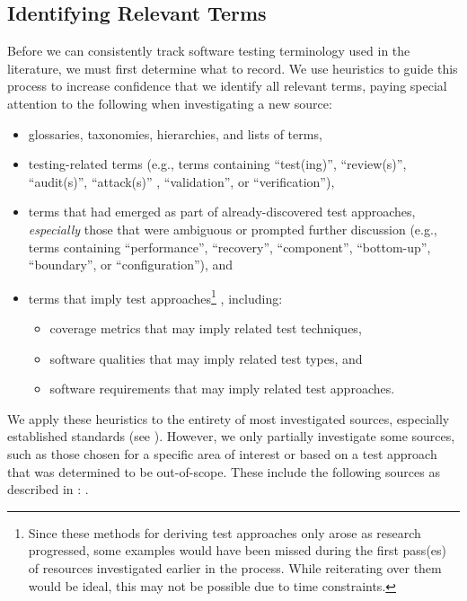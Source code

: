 \subsection{Identifying Relevant Terms}\label{ident-terms}
Before we can consistently track software testing terminology used in the
literature, we must first determine what to record. We use heuristics to guide
this process to increase confidence that we identify all relevant terms, paying
special attention to the following when investigating a new source:
\begin{itemize}
    \item glossaries, taxonomies, hierarchies, and lists of terms,
    \item testing-related terms (e.g., terms containing ``test(ing)'',
          \ifnotpaper ``review(s)'', ``audit(s)'', ``attack(s)''%
              , \fi ``validation'', or ``verification''),
    \item terms that had emerged as part of already-discovered
          test approaches, \emph{especially} those that were ambiguous
          or prompted further discussion (e.g., terms containing
          ``performance'', ``recovery'', ``component'', ``bottom-up'',
          \ifnotpaper ``boundary'', \fi or ``configuration''), and
    \item terms that imply test approaches\ifnotpaper\footnote{
                  Since these methods for deriving test approaches only arose
                  as research progressed, some examples would have been missed
                  during the first pass(es) of resources investigated earlier
                  in the process. While reiterating over them would be ideal,
                  this may not be possible due to time constraints.
              }%
          \fi, including:
          \newcommand\derivTest[2]{#1 that may imply \ifnotpaper related \fi test #2}
          \begin{itemize}
              \item \derivTest{coverage metrics}{techniques},
              \item {}\label{qual-types}
                    \derivTest{software qualities}{types}, and
              \item {}\label{req-apps}
                    \derivTest{\ifnotpaper software \fi requirements}{approaches}.
          \end{itemize}
\end{itemize}
We apply these heuristics to the entirety of most investigated sources,
especially established standards (see ). However, we only partially
investigate some sources, such as those chosen for a specific area of
interest or based on a test approach that was determined to be out-of-scope.
These include the following sources as described in :
\citet{ISO2022,ISO2015,Dominguez-PumarEtAl2020,PierreEtAl2017,
    TrudnowskiEtAl2017,YuEtAl2011,Tsui2007,Goralski1999}.

